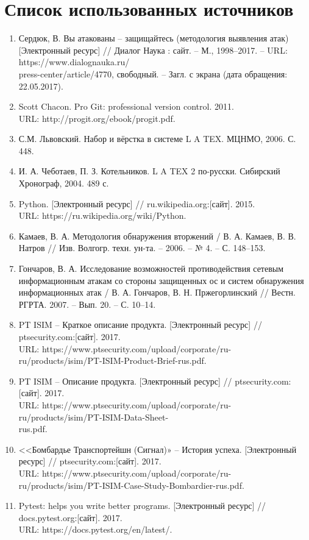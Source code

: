 \section*{Список использованных источников}


\begin{enumerate}
\item Сердюк, В. Вы атакованы – защищайтесь (методология выявления атак) [Электронный ресурс] // Диалог Наука : сайт. – М., 1998–2017. – URL: https://www.dialognauka.ru/ \\press-center/article/4770, свободный. – Загл. с экрана (дата обращения: 22.05.2017). 
\item Scott Chacon. Pro Git: professional version control. 2011. \\ URL: http://progit.org/ebook/progit.pdf.
\item С.М. Львовский. Набор и вёрстка в системе L A TEX. МЦНМО, 2006. С. 448.
\item И. А. Чеботаев, П. З. Котельников. L A TEX 2 по-русски. Сибирский Хронограф, 2004. 489 с.
\item Python. [Электронный ресурс] // ru.wikipedia.org:[сайт]. 2015.\\ URL: https://ru.wikipedia.org/wiki/Python.
\item Камаев, В. А. Методология обнаружения вторжений / В. А. Камаев, В. В. Натров // Изв. Волгогр. техн. ун-та. – 2006. – № 4. – С. 148–153.
\item Гончаров, В. А. Исследование возможностей противодействия сетевым информационным атакам со стороны защищенных ос и систем обнаружения информационных атак / В. А. Гончаров, В. Н. Пржегорлинский // Вестн. РГРТА. 2007. – Вып. 20. – С. 10–14.
\item PT ISIM -- Краткое описание продукта. [Электронный ресурс] // ptsecurity.com:[сайт]. 2017.\\ URL: https://www.ptsecurity.com/upload/corporate/ru-ru/products/isim/PT-ISIM-Product-Brief-rus.pdf.
\item PT ISIM -- Описание продукта. [Электронный ресурс] // ptsecurity.com:[сайт]. 2017.\\ URL: https://www.ptsecurity.com/upload/corporate/ru-ru/products/isim/PT-ISIM-Data-Sheet-\\rus.pdf.
\item <<Бомбардье Транспортейшн (Сигнал)» -- История успеха. [Электронный ресурс] // ptsecurity.com:[сайт]. 2017.\\ URL: https://www.ptsecurity.com/upload/corporate/ru-ru/products/isim/PT-ISIM-Case-Study-Bombardier-rus.pdf.
\item Pytest: helps you write better programs. [Электронный ресурс] // docs.pytest.org:[сайт]. 2017.\\ URL: https://docs.pytest.org/en/latest/.
\end{enumerate}
